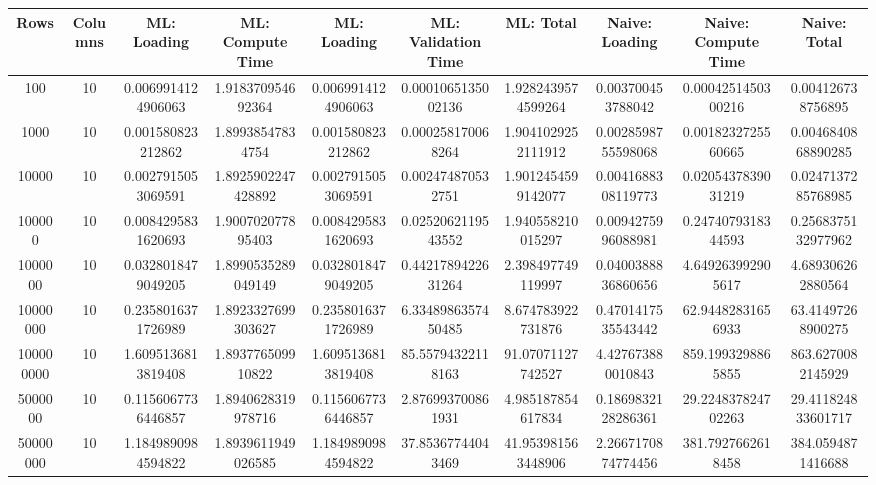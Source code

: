 \begin{table}[htb]
    \centering
    \begin{tabular}{@{}cccccccccc@{}}
        \toprule
        Rows & Columns & ML: Loading & ML: Compute Time & ML: Loading & ML: Validation Time & ML: Total & Naive: Loading & Naive: Compute Time & Naive: Total \\
        \midrule
        100 & 10 & 0.0069914124906063 & 1.918370954692364 & 0.0069914124906063 & 0.0001065135002136 & 1.9282439574599264 & 0.003700453788042 & 0.0004251450300216 & 0.004126738756895 \\
        1000 & 10 & 0.001580823212862 & 1.89938547834754 & 0.001580823212862 & 0.000258170068264 & 1.9041029252111912 & 0.0028598755598068 & 0.0018232725560665 & 0.0046840868890285 \\
        10000 & 10 & 0.0027915053069591 & 1.8925902247428892 & 0.0027915053069591 & 0.002474870532751 & 1.9012454599142077 & 0.0041688308119773 & 0.0205437839031219 & 0.0247137285768985 \\
        100000 & 10 & 0.0084295831620693 & 1.900702077895403 & 0.0084295831620693 & 0.0252062119543552 & 1.940558210015297 & 0.0094275996088981 & 0.2474079318344593 & 0.2568375132977962 \\
        1000000 & 10 & 0.0328018479049205 & 1.8990535289049149 & 0.0328018479049205 & 0.4421789422631264 & 2.398497749119997 & 0.0400388836860656 & 4.649263992905617 & 4.689306262880564 \\
        10000000 & 10 & 0.2358016371726989 & 1.8923327699303627 & 0.2358016371726989 & 6.3348986357450485 & 8.674783922731876 & 0.4701417535543442 & 62.94482831656933 & 63.41497268900275 \\
        100000000 & 10 & 1.6095136813819408 & 1.893776509910822 & 1.6095136813819408 & 85.55794322118163 & 91.07071127742527 & 4.427673880010843 & 859.1993298865855 & 863.6270082145929 \\
        5000000 & 10 & 0.1156067736446857 & 1.8940628319978716 & 0.1156067736446857 & 2.876993700861931 & 4.985187854617834 & 0.1869832128286361 & 29.224837824702263 & 29.411824833601717 \\
        50000000 & 10 & 1.1849890984594822 & 1.8939611949026585 & 1.1849890984594822 & 37.85367744043469 & 41.953981563448906 & 2.2667170874774456 & 381.7927662618458 & 384.0594871416688 \\
        \bottomrule
    \end{tabular}
\end{table}